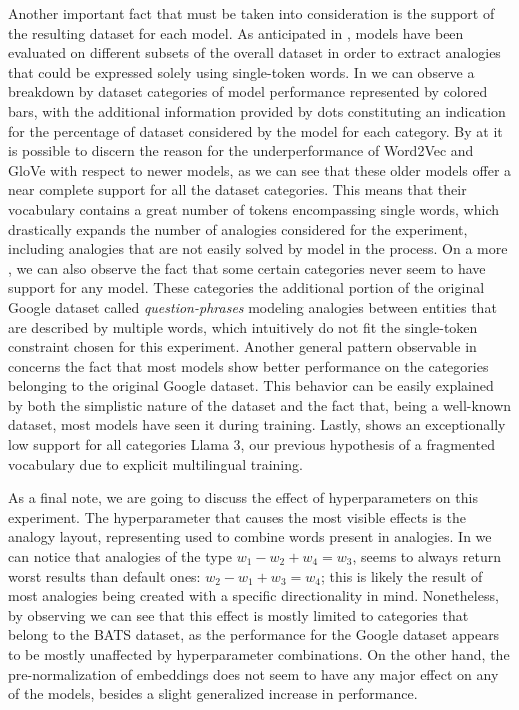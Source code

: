 Another important fact that must be taken into consideration is the support of the resulting dataset for each model.
As anticipated in , models have been evaluated on different subsets of the overall dataset in order to extract analogies that could be expressed solely using single-token words.
In  we can observe a breakdown by dataset categories of model performance represented by colored bars, with the additional information provided by dots constituting an indication for the percentage of dataset considered by the model for each category.
By  at  it is possible to discern the reason for the underperformance of Word2Vec and GloVe with respect to newer models, as we can see that these older models offer a near complete support for all the dataset categories.
This means that their vocabulary contains a great number of tokens encompassing single words, which drastically expands the number of analogies considered for the experiment, including analogies that are not easily solved by model in the process.
On a more , we can also observe the fact that some certain categories never seem to have support for any model.
These categories  the additional portion of the original Google dataset called \textit{question-phrases} modeling analogies between entities that are described by multiple words, which intuitively do not fit the single-token constraint chosen for this experiment.
Another general pattern observable in  concerns the fact that most models show better performance on the categories belonging to the original Google dataset.
This behavior can be easily explained by both the simplistic nature of the dataset and the fact that, being a well-known dataset, most models have seen it during training.
Lastly,  shows an exceptionally low support for all categories  Llama 3,  our previous hypothesis of a fragmented vocabulary due to explicit multilingual training.


As a final note, we are going to discuss the effect of hyperparameters on this experiment.
The hyperparameter that causes the most visible effects is the analogy layout, representing  used to combine words present in analogies.
In  we can notice that analogies of the type $w_1 - w_2 + w_4 = w_3$, seems to always return worst results than default ones: $w_2 - w_1 + w_3 = w_4$; this is likely the result of most analogies being created with a specific directionality in mind.
Nonetheless, by observing  we can see that this effect is mostly limited to categories that belong to the BATS dataset, as the performance for the Google dataset appears to be mostly unaffected by hyperparameter combinations.
On the other hand, the pre-normalization of embeddings does not seem to have any major effect on any of the models, besides a slight generalized increase in performance.

